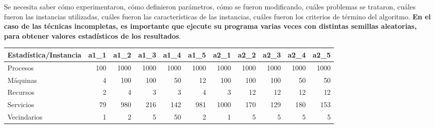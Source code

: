 \documentclass[../informe2.tex]{subfiles}
\begin{document}
Se necesita saber cómo experimentaron, cómo definieron parámetros,
cómo se fueron modificando, cuáles problemas se trataron, cuáles fueron
las instancias utilizadas, cuáles fueron las características de las
instancias, cuáles fueron los criterios de término del algoritmo.
\textbf{En el caso de las técnicas incompletas, es importante que
ejecute su programa varias veces con distintas semillas aleatorias,
para obtener valores estadísticos de los resultados}.

\begin{table}[h]
	\small
	\centering
	\begin{tabular}{@{}lrrrrrrrrrr@{}}
		\toprule
		Estadística/Instancia & a1\_1 & a1\_2 & a1\_3 & a1\_4 & a1\_5 & a2\_1 & a2\_2 & a2\_3 & a2\_4 & a2\_5 \\ \midrule
		Procesos              & 100                       & 1000                      & 1000                      & 1000                      & 1000                      & 1000                      & 1000                      & 1000                      & 1000                      & 1000                      \\
		Máquinas              & 4                         & 100                       & 100                       & 50                        & 12                        & 100                       & 100                       & 100                       & 50                        & 50                        \\
		Recursos              & 2                         & 4                         & 3                         & 3                         & 4                         & 3                         & 12                        & 12                        & 12                        & 12                        \\
		Servicios             & 79                        & 980                       & 216                       & 142                       & 981                       & 1000                      & 170                       & 129                       & 180                       & 153                       \\
		Vecindarios           & 1                         & 2                         & 5                         & 50                        & 2                         & 1                         & 5                         & 5                         & 5                         & 5                         \\

\end{tabular}
\end{table}
\end{document}
